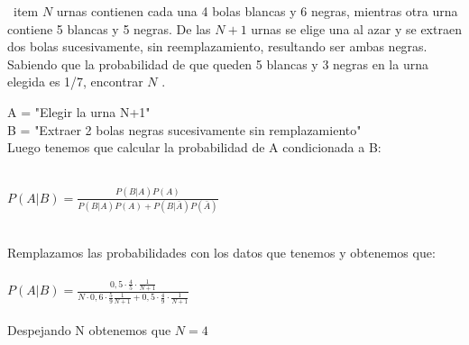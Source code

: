 \problem
\ item  $ N $ urnas contienen cada una 4 bolas blancas y 6 negras, mientras otra
urna contiene 5 blancas y 5 negras. De las $ N + 1 $ urnas se elige una al
azar y se extraen dos bolas sucesivamente, sin reemplazamiento,
resultando ser ambas negras. Sabiendo que la probabilidad de que
queden 5 blancas y 3 negras en la urna elegida es 1/7, encontrar $ N $ .
	
	\begin{flushleft}
		A = "Elegir la urna N+1" \\
		B = "Extraer 2 bolas negras sucesivamente sin remplazamiento" \\
		Luego tenemos que calcular la probabilidad de A condicionada a B:\\ \\
	\end{flushleft}
	
\begin{flushleft}
	
		$P(A|B) = \frac{P(B|A)P(A)}{P(B|A)P(A)+P(B|\bar{A})P(\bar{A})} $\\ \\
\end{flushleft}
Remplazamos las probabilidades con los datos que tenemos y obtenemos que: \\ \\
$P(A|B) = \frac{0,5 \cdot \frac{4}{5} \cdot \frac{1}{N+1}}{N\cdot0,6\cdot\frac{5}{9}\frac{1}{N+1} + 0,5\cdot\frac{4}{9}\cdot\frac{1}{N+1}} $\\\\
Despejando N obtenemos que $N=4$
